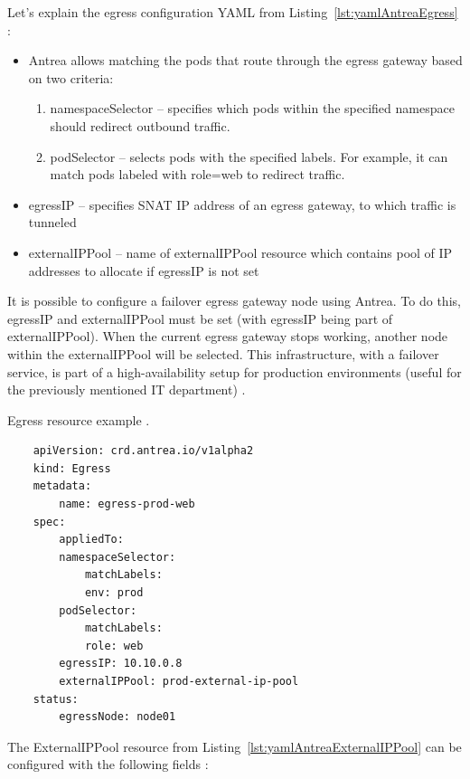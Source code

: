 Let's explain the egress configuration YAML from Listing~\ref{lst:yamlAntreaEgress} \cite{AntreaEgressArch}:
\begin{itemize}
    \item Antrea allows matching the pods that route through the egress gateway based on two criteria:

    \begin{enumerate}
        \item namespaceSelector -- specifies which pods within the specified namespace should redirect outbound traffic.
        \item podSelector -- selects pods with the specified labels. For example, it can match pods labeled with role=web to redirect traffic.
    \end{enumerate}

    \item egressIP -- specifies SNAT IP address of an egress gateway, to which traffic is tunneled
    \item externalIPPool -- name of externalIPPool resource which contains pool of IP addresses to allocate if egressIP is not set
\end{itemize}

It is possible to configure a failover egress gateway node using Antrea. To do this, egressIP and externalIPPool must be set (with egressIP being part of externalIPPool). When the current egress gateway stops working, another node within the externalIPPool will be selected. This infrastructure, with a failover service, is part of a high-availability setup for production environments (useful for the previously mentioned IT department) \cite{AntreaEgressArch}.


\begin{listing}[htb]
    \centering
    \caption{Egress resource example \cite{AntreaEgressArch}.}
    \begin{verbatim}
    apiVersion: crd.antrea.io/v1alpha2
    kind: Egress
    metadata:
        name: egress-prod-web
    spec:
        appliedTo:
        namespaceSelector:
            matchLabels:
            env: prod
        podSelector:
            matchLabels:
            role: web
        egressIP: 10.10.0.8
        externalIPPool: prod-external-ip-pool
    status:
        egressNode: node01
    \end{verbatim}
    \label{lst:yamlAntreaEgress}
\end{listing}

The ExternalIPPool resource from Listing~\ref{lst:yamlAntreaExternalIPPool} can be configured with the following fields \cite{AntreaEgressArch}:

